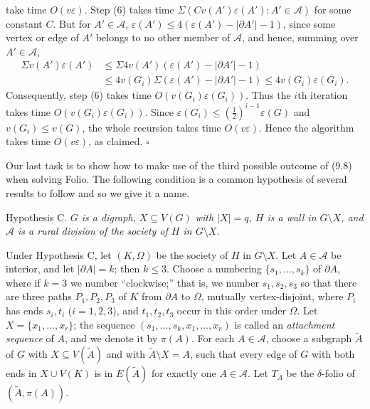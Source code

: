 \noindent take time $O(v\varepsilon)$. Step (6) takes time $\Sigma(Cv(A')\varepsilon(A') : A' \in \mathcal{A})$ for some constant $C$. But for $A' \in \mathcal{A}$, $\varepsilon(A') \le 4(\varepsilon(A') - |\partial A'| - 1)$, since some vertex or edge of $A'$ belongs to no other member of $\mathcal{A}$, and hence, summing over $A' \in \mathcal{A}$,
\begin{align*}
\Sigma v(A')\varepsilon(A') &\le \Sigma 4v(A')(\varepsilon(A') - |\partial A'| - 1) \\
&\le 4v(G_i)\Sigma(\varepsilon(A') - |\partial A'| - 1) \le 4v(G_i)\varepsilon(G_i).
\end{align*}
Consequently, step (6) takes time $O(v(G_i)\varepsilon(G_i))$. Thus the $i$th iteration takes time $O(v(G_i)\varepsilon(G_i))$. Since $\varepsilon(G_i) \le (\frac{1}{2})^{i-1}\varepsilon(G)$ and $v(G_i) \le v(G)$, the whole recursion takes time $O(v\varepsilon)$. Hence the algorithm takes time $O(v\varepsilon)$, as claimed. $\square$


Our last task is to show how to make use of the third possible outcome of (9.8) when solving Folio. The following condition is a common hypothesis of several results to follow and so we give it a name.

Hypothesis C. \textit{$G$ is a digraph, $X \subseteq V(G)$ with $|X| = q$, $H$ is a wall in $G \setminus X$, and $\mathcal{A}$ is a rural division of the society of $H$ in $G \setminus X$.}

Under Hypothesis C, let $(K, \Omega)$ be the society of $H$ in $G \setminus X$. Let $A \in \mathcal{A}$ be interior, and let $|\partial A| = k$; then $k \le 3$. Choose a numbering $\{s_1, \dots, s_k\}$ of $\partial A$, where if $k = 3$ we number ``clockwise;'' that is, we number $s_1, s_2, s_3$ so that there are three paths $P_1, P_2, P_3$ of $K$ from $\partial A$ to $\bar{\Omega}$, mutually vertex-disjoint, where $P_i$ has ends $s_i, t_i$ ($i = 1, 2, 3$), and $t_1, t_2, t_3$ occur in this order under $\Omega$. Let $X = \{x_1, \dots, x_r\}$; the sequence $(s_1, \dots, s_k, x_1, \dots, x_r)$ is called an \textit{attachment sequence} of $A$, and we denote it by $\pi(A)$. For each $A \in \mathcal{A}$, choose a subgraph $\tilde{A}$ of $G$ with $X \subseteq V(\tilde{A})$ and with $\tilde{A} \setminus X = A$, such that every edge of $G$ with both ends in $X \cup V(K)$ is in $E(\tilde{A})$ for exactly one $A \in \mathcal{A}$. Let $T_A$ be the $\delta$-folio of $(\tilde{A}, \pi(A))$.

